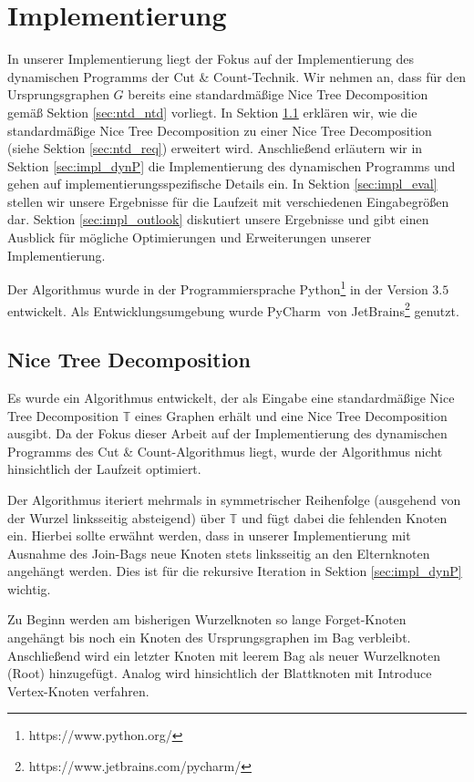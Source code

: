 \chapter{Implementierung}
\label{c:impl}
In unserer Implementierung liegt der Fokus auf der Implementierung des dynamischen Programms der Cut \& Count-Technik. 
Wir nehmen an, dass für den Ursprungsgraphen $G$ bereits eine standardmäßige Nice Tree Decomposition gemäß Sektion \ref{sec:ntd_ntd} vorliegt. 
In Sektion \ref{sec:impl_ntd} erklären wir, wie die standardmäßige Nice Tree Decomposition zu einer Nice Tree Decomposition (siehe Sektion \ref{sec:ntd_req}) erweitert wird. 
Anschließend erläutern wir in Sektion \ref{sec:impl_dynP} die Implementierung des dynamischen Programms und gehen auf implementierungsspezifische Details ein. 
In Sektion \ref{sec:impl_eval} stellen wir unsere Ergebnisse für die Laufzeit mit verschiedenen Eingabegrößen dar.
Sektion \ref{sec:impl_outlook} diskutiert unsere Ergebnisse und gibt einen Ausblick für mögliche Optimierungen und Erweiterungen unserer Implementierung.

Der Algorithmus wurde in der Programmiersprache Python\footnote{https://www.python.org/} in der Version $3.5$ entwickelt. 
Als Entwicklungsumgebung wurde PyCharm\SymbReg ~von JetBrains\footnote{https://www.jetbrains.com/pycharm/} genutzt.
\section{Nice Tree Decomposition}
\label{sec:impl_ntd}
Es wurde ein Algorithmus entwickelt, der als Eingabe eine standardmäßige Nice Tree Decomposition $\mathbb{T}$ eines Graphen erhält und eine Nice Tree Decomposition ausgibt. 
Da der Fokus dieser Arbeit auf der Implementierung des dynamischen Programms des Cut \& Count-Algorithmus liegt, wurde der Algorithmus nicht hinsichtlich der Laufzeit optimiert. 

Der Algorithmus iteriert mehrmals in symmetrischer Reihenfolge (ausgehend von der Wurzel linksseitig absteigend) über $\mathbb{T}$ und fügt dabei die fehlenden Knoten ein. 
Hierbei sollte erwähnt werden, dass in unserer Implementierung mit Ausnahme des \glqq Join\grqq -Bags neue Knoten stets linksseitig an den Elternknoten angehängt werden. 
Dies ist für die rekursive Iteration in Sektion \ref{sec:impl_dynP} wichtig.

Zu Beginn werden am bisherigen Wurzelknoten so lange \glqq Forget\grqq -Knoten angehängt bis noch ein Knoten des Ursprungsgraphen im Bag verbleibt. 
Anschließend wird ein letzter Knoten mit leerem Bag als neuer Wurzelknoten (\glqq Root\grqq) hinzugefügt. 
Analog wird hinsichtlich der Blattknoten mit \glqq Introduce Vertex\grqq -Knoten verfahren. 
 
